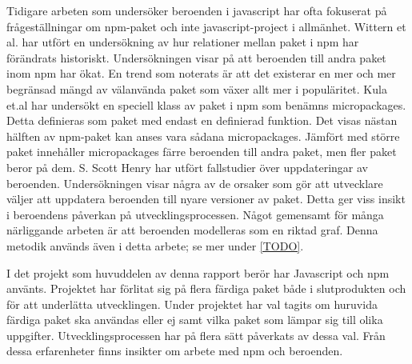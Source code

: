 Tidigare arbeten som undersöker beroenden i javascript har ofta fokuserat på frågeställningar om npm-paket och inte javascript-project i allmänhet. Wittern et al. har utfört en undersökning av hur relationer mellan paket i npm har förändrats historiskt.\cite{Wittern:2016} Undersökningen visar på att beroenden till andra paket inom npm har ökat. En trend som noterats är att det existerar en mer och mer begränsad mängd av välanvända paket som växer allt mer i populäritet. Kula et.al har undersökt en speciell klass av paket i npm som benämns micropackages.\cite{Kula2017} Detta definieras som paket med endast en definierad funktion. Det visas nästan hälften av npm-paket kan anses vara sådana micropackages. Jämfört med större paket innehåller micropackages färre beroenden till andra paket, men fler paket beror på dem. S. Scott Henry har utfört fallstudier över uppdateringar av beroenden.\cite{Henry2017} Undersökningen visar några av de orsaker som gör att utvecklare väljer att uppdatera beroenden till nyare versioner av paket. Detta ger viss insikt i beroendens påverkan på utvecklingsprocessen. Något gemensamt för många närliggande arbeten är att beroenden modelleras som en riktad graf. Denna metodik används även i detta arbete; se mer under \ref{TODO}.

I det projekt som huvuddelen av denna rapport berör har Javascript och npm använts. Projektet har förlitat sig på flera färdiga paket både i slutprodukten och för att underlätta utvecklingen. Under projektet har val tagits om huruvida färdiga paket ska användas eller ej samt vilka paket som lämpar sig till olika uppgifter. Utvecklingsprocessen har på flera sätt påverkats av dessa val. Från dessa erfarenheter finns insikter om arbete med npm och beroenden.
